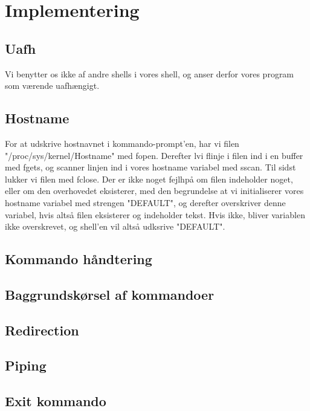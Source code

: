 \section{Implementering}
\subsection{Uafh}
Vi benytter os ikke af andre shells i vores shell, og anser derfor vores program som værende uafhængigt. 

\subsection{Hostname}
For at udskrive hostnavnet i kommando-prompt'en, har vi  filen "/proc/sys/kernel/Hostname" med fopen. Derefter l vi f linje i filen ind i en buffer med fgets, og scanner linjen ind i vores hostname variabel med sscan. Til sidst lukker vi filen med fclose. Der er ikke noget fejlh på om filen indeholder noget, eller om den overhovedet eksisterer, med den begrundelse at vi initialiserer vores hostname variabel med strengen "DEFAULT", og derefter overskriver denne variabel, hvis altså filen eksisterer og indeholder tekst. Hvis ikke, bliver variablen ikke overskrevet, og shell'en vil altså udksrive "DEFAULT".

\subsection{Kommando håndtering}

\subsection{Baggrundskørsel af kommandoer}

\subsection{Redirection}

\subsection{Piping}

\subsection{Exit kommando}

